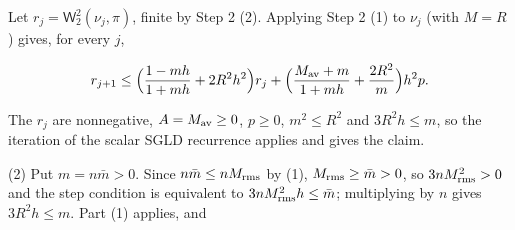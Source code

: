 \documentclass[11pt,a4paper]{article}
\begin{document}
Let \(r_j=\mathsf W_2^2(\nu_j,\pi)\), finite by Step 2 (2). Applying Step 2 (1) to \(\nu_j\) (with \(M=R\)) gives, for every \(j\),


\[r_{j+1}\le\Bigl(\frac{1-mh}{1+mh}+2R^2h^2\Bigr)r_j+\Bigl(\frac{M_{\rm av}+m}{1+mh}+\frac{2R^2}m\Bigr)h^2p.\]


The \(r_j\) are nonnegative, \(A=M_{\rm av}\ge0\), \(p\ge0\), \(m^2\le R^2\) and \(3R^2h\le m\), so the iteration of the scalar SGLD recurrence applies and gives the claim.




(2) Put \(m=n\bar m>0\). Since \(n\bar m\le nM_{\rm rms}\) by (1), \(M_{\rm rms}\ge\bar m>0\), so \(3nM_{\rm rms}^2>0\) and the step condition is equivalent to \(3nM_{\rm rms}^2h\le\bar m\); multiplying by \(n\) gives \(3R^2h\le m\). Part (1) applies, and
\end{document}
